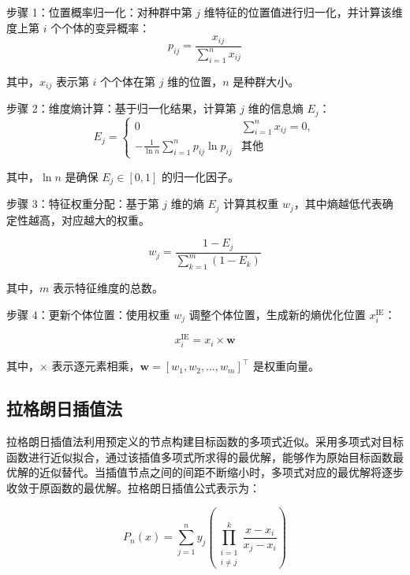 \documentclass{wzuthesis}
\begin{document}
步骤 1：位置概率归一化：对种群中第 $j$ 维特征的位置值进行归一化，并计算该维度上第 $i$ 个个体的变异概率：
\begin{equation}
    p_{ij} = \frac{x_{ij}}{\sum_{i=1}^n x_{ij}}
\label{eq:mutation probability p}
\end{equation}

其中，${x}_{ij}$ 表示第 $i$ 个个体在第 $j$ 维的位置，$n$ 是种群大小。

步骤 2：维度熵计算：基于归一化结果，计算第 $j$ 维的信息熵 ${E}_{j}$：
\begin{equation}
E_j = \begin{cases} 
0 & \sum_{i=1}^n x_{ij} = 0, \\
-\frac{1}{\ln n} \sum_{i=1}^n p_{ij} \ln p_{ij} & \text{其他}
\end{cases}
\label{eq:information entropy E}
\end{equation}

其中，$\ln n$ 是确保 ${E}_{j} \in  \left\lbrack  {0,1}\right\rbrack$ 的归一化因子。

步骤 3：特征权重分配：基于第 $j$ 维的熵 ${E}_{j}$ 计算其权重 ${w}_{j}$，其中熵越低代表确定性越高，对应越大的权重。

\begin{equation}
    w_j = \frac{1 - E_j}{\sum_{k=1}^m (1 - E_k)}
\label{eq:feature weight}
\end{equation}

其中，$m$ 表示特征维度的总数。

步骤 4：更新个体位置：使用权重 ${w}_{j}$ 调整个体位置，生成新的熵优化位置 ${x}_{i}^{\mathrm{{IE}}}$：

\begin{equation}
    x_i^{\text{IE}} = x_i \times \boldsymbol{w}
    \label{eq:new entropy-optimized positions}
\end{equation}

其中，$\times$ 表示逐元素相乘，$\mathbf{w} = {\left\lbrack  {w}_{1},{w}_{2},\ldots ,{w}_{m}\right\rbrack  }^{\top }$ 是权重向量。
\subsection{拉格朗日插值法}
拉格朗日插值法利用预定义的节点构建目标函数的多项式近似。采用多项式对目标函数进行近似拟合，通过该插值多项式所求得的最优解，能够作为原始目标函数最优解的近似替代。当插值节点之间的间距不断缩小时，多项式对应的最优解将逐步收敛于原函数的最优解。拉格朗日插值公式表示为：

\begin{equation}
    P_n(x) = \sum_{j=1}^n y_j \left( \prod_{\substack{i=1 \\ i \neq j}}^{k} \frac{x - x_i}{x_j - x_i} \right)
\label{eq:Lagrange interpolation}
\end{equation}
\end{document}
